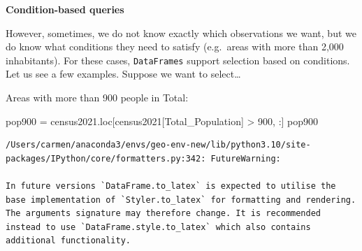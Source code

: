 \documentclass[
  letterpaper,
  DIV=11,
  numbers=noendperiod]{scrreprt}
\newenvironment{Shaded}{\begin{snugshade}}{\end{snugshade}}
\newcommand{\DecValTok}[1]{\textcolor[rgb]{0.68,0.00,0.00}{#1}}
\newcommand{\NormalTok}[1]{\textcolor[rgb]{0.00,0.23,0.31}{#1}}
\newcommand{\OperatorTok}[1]{\textcolor[rgb]{0.37,0.37,0.37}{#1}}
\newcommand{\StringTok}[1]{\textcolor[rgb]{0.13,0.47,0.30}{#1}}
\begin{document}
\textbf{Condition-based queries}

However, sometimes, we do not know exactly which observations we want,
but we do know what conditions they need to satisfy (e.g.~areas with
more than 2,000 inhabitants). For these cases, \texttt{DataFrames}
support selection based on conditions. Let us see a few examples.
Suppose we want to select\ldots{}

Areas with more than 900 people in Total:

\begin{Shaded}
\begin{Highlighting}[]
\NormalTok{pop900 }\OperatorTok{=}\NormalTok{ census2021.loc[census2021[}\StringTok{\textquotesingle{}Total\_Population\textquotesingle{}}\NormalTok{] }\OperatorTok{\textgreater{}} \DecValTok{900}\NormalTok{, :]}
\NormalTok{pop900}
\end{Highlighting}
\end{Shaded}

\begin{verbatim}
/Users/carmen/anaconda3/envs/geo-env-new/lib/python3.10/site-packages/IPython/core/formatters.py:342: FutureWarning:

In future versions `DataFrame.to_latex` is expected to utilise the base implementation of `Styler.to_latex` for formatting and rendering. The arguments signature may therefore change. It is recommended instead to use `DataFrame.style.to_latex` which also contains additional functionality.
\end{verbatim}
\end{document}

